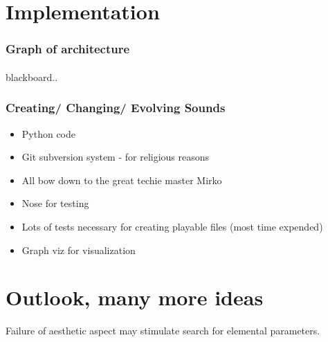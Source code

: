 \documentclass{beamer}
\begin{document}


\section{Implementation} %

\begin{frame}
	\frametitle{Graph of architecture}
	\framesubtitle{}
	blackboard..
\end{frame}


\begin{frame}
	\frametitle{Creating/ Changing/ Evolving Sounds}
	\begin{itemize}
	\item<1-> Python code 
	\item<2-> Git subversion system - for religious reasons
	\item<3-> All bow down to the great techie master Mirko
	\item<4-> Nose for testing 
	\item<5-> Lots of tests necessary for creating playable files (most time expended)
	\item<6-> Graph viz for visualization
         \end{itemize}

\end{frame}


\label{sg:sec:imple}




\section{Outlook, many more ideas} %
\label{sg:sec:outlook_many_more_ideas}

 Failure of aesthetic aspect may stimulate search for elemental parameters.




\end{document}
